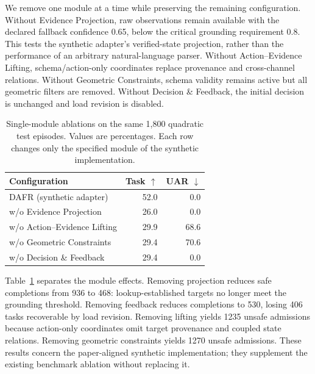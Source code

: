 We remove one module at a time while preserving the remaining configuration.
Without Evidence Projection, raw observations remain available with the
declared fallback confidence 0.65, below the critical grounding requirement
0.8. This tests the synthetic adapter's verified-state projection, rather
than the performance of an arbitrary natural-language parser.
Without Action--Evidence Lifting, schema/action-only coordinates replace
provenance and cross-channel relations. Without Geometric Constraints,
schema validity remains active but all geometric filters are removed.
Without Decision \& Feedback, the initial decision is unchanged and
load revision is disabled.

\begin{table}[t]
\centering
\small
\setlength{\tabcolsep}{3pt}
\begin{tabular}{lrr}
\toprule
Configuration & Task $\uparrow$ & UAR $\downarrow$\\
\midrule
DAFR (synthetic adapter) & 52.0 & 0.0 \\
w/o Evidence Projection & 26.0 & 0.0 \\
w/o Action--Evidence Lifting & 29.9 & 68.6 \\
w/o Geometric Constraints & 29.4 & 70.6 \\
w/o Decision \& Feedback & 29.4 & 0.0 \\
\bottomrule
\end{tabular}
\caption{Single-module ablations on the same 1,800 quadratic test episodes. Values are percentages. Each row changes only the specified module of the synthetic implementation.}
\label{tab:synthetic-module-ablation}
\end{table}

Table~\ref{tab:synthetic-module-ablation} separates the module effects.
Removing projection reduces safe completions from 936
to 468: lookup-established targets no longer
meet the grounding threshold. Removing feedback reduces completions to
530, losing 406
tasks recoverable by load revision. Removing lifting yields
1235 unsafe admissions because action-only
coordinates omit target provenance and coupled state relations. Removing
geometric constraints yields 1270 unsafe admissions.
These results concern the paper-aligned synthetic implementation; they
supplement the existing benchmark ablation without replacing it.
